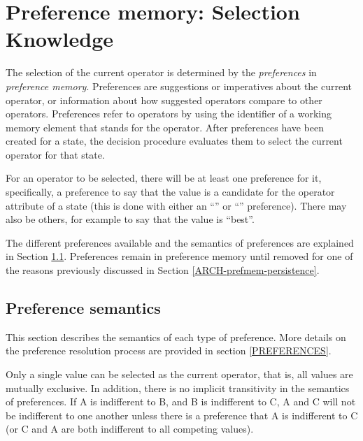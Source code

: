\section{Preference memory: Selection Knowledge} 
\label{ARCH-prefmem}


The selection of the current operator is determined by the \emph{preferences} in
\emph{preference memory}. Preferences are suggestions or imperatives about the
current operator, or information about how suggested operators compare
to other operators.  Preferences refer to operators by using the
identifier of a working memory element that stands for the operator.
After preferences have been created for a state, the decision procedure
evaluates them to select the current operator for that state.

For an operator to be selected, there will be at least one preference
for it, specifically, a preference to say that the value is a candidate
for the operator attribute of a state (this is done with either an
``'' or ``'' preference). There may also
be others, for example to say that the value is ``best''.

The different preferences available and the semantics of preferences are
explained in Section \ref{ARCH-prefmem-semantics}. Preferences remain in
preference memory until removed for one of the reasons previously discussed in
Section \ref{ARCH-prefmem-persistence}.

\subsection{Preference semantics}
\label{ARCH-prefmem-semantics}

This section describes the semantics of each type of preference.  More
details on the preference resolution process are provided in
section \ref{PREFERENCES}.


Only a single value can be selected as the current operator, that is,
all values are mutually exclusive.  In addition, there is no implicit
transitivity in the semantics of preferences.  If A is indifferent to B,
and B is indifferent to C, A and C will not be indifferent to one
another unless there is a preference that A is indifferent to C (or C
and A are both indifferent to all competing values).

